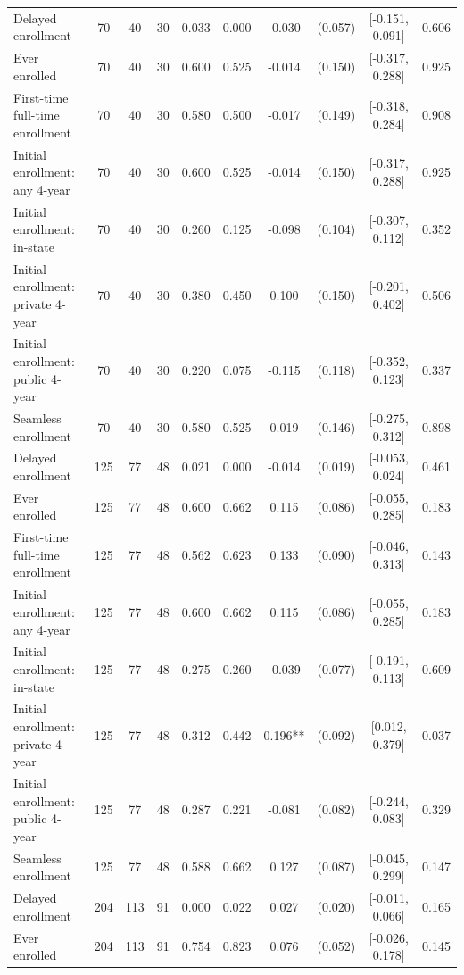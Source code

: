 \begin{table}[t]
\begin{tabular*}{\linewidth}{@{\extracolsep{\fill}}l|ccccccccc}
Delayed enrollment & 70 & 40 & 30 & 0.033 & 0.000 & -0.030 & (0.057) & [-0.151, 0.091] & 0.606 \\ 
Ever enrolled & 70 & 40 & 30 & 0.600 & 0.525 & -0.014 & (0.150) & [-0.317, 0.288] & 0.925 \\ 
First-time full-time enrollment & 70 & 40 & 30 & 0.580 & 0.500 & -0.017 & (0.149) & [-0.318, 0.284] & 0.908 \\ 
Initial enrollment: any 4-year & 70 & 40 & 30 & 0.600 & 0.525 & -0.014 & (0.150) & [-0.317, 0.288] & 0.925 \\ 
Initial enrollment: in-state & 70 & 40 & 30 & 0.260 & 0.125 & -0.098 & (0.104) & [-0.307, 0.112] & 0.352 \\ 
Initial enrollment: private 4-year & 70 & 40 & 30 & 0.380 & 0.450 & 0.100 & (0.150) & [-0.201, 0.402] & 0.506 \\ 
Initial enrollment: public 4-year & 70 & 40 & 30 & 0.220 & 0.075 & -0.115 & (0.118) & [-0.352, 0.123] & 0.337 \\ 
Seamless enrollment & 70 & 40 & 30 & 0.580 & 0.525 & 0.019 & (0.146) & [-0.275, 0.312] & 0.898 \\ 
Delayed enrollment & 125 & 77 & 48 & 0.021 & 0.000 & -0.014 & (0.019) & [-0.053, 0.024] & 0.461 \\ 
Ever enrolled & 125 & 77 & 48 & 0.600 & 0.662 & 0.115 & (0.086) & [-0.055, 0.285] & 0.183 \\ 
First-time full-time enrollment & 125 & 77 & 48 & 0.562 & 0.623 & 0.133 & (0.090) & [-0.046, 0.313] & 0.143 \\ 
Initial enrollment: any 4-year & 125 & 77 & 48 & 0.600 & 0.662 & 0.115 & (0.086) & [-0.055, 0.285] & 0.183 \\ 
Initial enrollment: in-state & 125 & 77 & 48 & 0.275 & 0.260 & -0.039 & (0.077) & [-0.191, 0.113] & 0.609 \\ 
Initial enrollment: private 4-year & 125 & 77 & 48 & 0.312 & 0.442 & 0.196** & (0.092) & [0.012, 0.379] & 0.037 \\ 
Initial enrollment: public 4-year & 125 & 77 & 48 & 0.287 & 0.221 & -0.081 & (0.082) & [-0.244, 0.083] & 0.329 \\ 
Seamless enrollment & 125 & 77 & 48 & 0.588 & 0.662 & 0.127 & (0.087) & [-0.045, 0.299] & 0.147 \\ 
Delayed enrollment & 204 & 113 & 91 & 0.000 & 0.022 & 0.027 & (0.020) & [-0.011, 0.066] & 0.165 \\ 
Ever enrolled & 204 & 113 & 91 & 0.754 & 0.823 & 0.076 & (0.052) & [-0.026, 0.178] & 0.145 \\ 

\end{tabular*}
\end{table}
